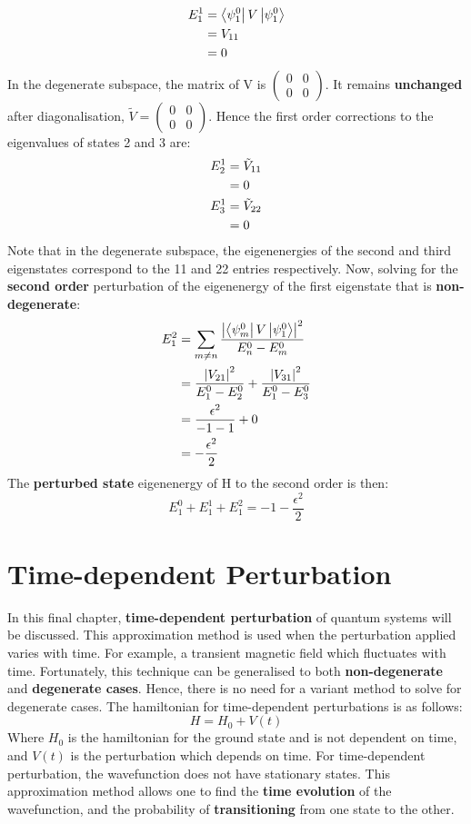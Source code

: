 \documentclass{article}
\begin{document}
\begin{flushleft}
\begin{align*}
    E_1^1&=\bra{\psi_1^0}V\ket{\psi_1^0}\\
    &=V_{11}\\
    &=0
\end{align*}
In the degenerate subspace, the matrix of V is $\begin{pmatrix}
    0 & 0\\ 
    0 & 0
\end{pmatrix}$. It remains \textbf{unchanged} after diagonalisation, $\tilde{V}=\begin{pmatrix}
    0 & 0\\
    0 & 0
\end{pmatrix}$. Hence the first order corrections to the eigenvalues of states 2 and 3 are:
\begin{align*}
    E_2^1&=\Tilde{V}_{11}\\
    &=0\\
    E_3^1&=\Tilde{V}_{22}\\
    &=0
\end{align*}
Note that in the degenerate subspace, the eigenenergies of the second and third eigenstates correspond to the 11 and 22 entries respectively. Now, solving for the \textbf{second order} perturbation of the eigenenergy of the first eigenstate that is \textbf{non-degenerate}:
\begin{align*}
    E_1^2&=\sum_{m\neq n}\frac{\abs{\bra{\psi_m^0}V\ket{\psi_1^0}}^2}{E_n^0-E_m^0}\\
    &=\frac{\abs{V_{21}}^2}{E_1^0-E_2^0}+\frac{\abs{V_{31}}^2}{E_1^0-E_3^0}\\
    &=\frac{\epsilon^2}{-1-1}+0\\
    &=-\frac{\epsilon^2}{2}
\end{align*}
The \textbf{perturbed state} eigenenergy of H to the second order is then:
$$E_1^0+E_1^1+E_1^2=-1-\frac{\epsilon^2}{2}$$

\section{Time-dependent Perturbation}
In this final chapter, \textbf{time-dependent perturbation} of quantum systems will be discussed. This approximation method is used when the perturbation applied varies with time. For example, a transient magnetic field which fluctuates with time. Fortunately, this technique can be generalised to both \textbf{non-degenerate} and \textbf{degenerate cases}. Hence, there is no need for a variant method to solve for degenerate cases. The hamiltonian for time-dependent perturbations is as follows:
$$H=H_0+V(t)$$
Where $H_0$ is the hamiltonian for the ground state and is not dependent on time, and $V(t)$ is the perturbation which depends on time. For time-dependent perturbation, the wavefunction does not have stationary states. This approximation method allows one to find the \textbf{time evolution} of the wavefunction, and the probability of \textbf{transitioning} from one state to the other.\\[.5cm]


\end{flushleft}
\end{document}
